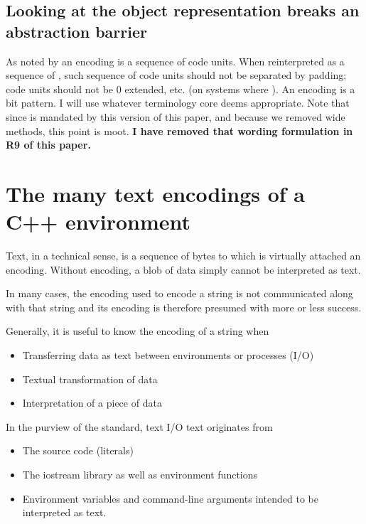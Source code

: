 \documentclass{wg21}
\begin{document}
\subsection{Looking at the object representation breaks an abstraction barrier}

As noted by  an encoding is a sequence of code units.
When reinterpreted as a sequence of , such sequence of code units should not be separated by padding; code units should not be 0 extended, etc. (on systems where ).
An encoding is a bit pattern.
I will use whatever terminology core deems appropriate. Note that since  is mandated by this version of this paper, and because we removed wide methods, this point is moot.
\textbf{I have removed that wording formulation in R9 of this paper.}

\pagebreak

\section{The many text encodings of a C++ environment}

Text, in a technical sense, is a sequence of bytes to which is virtually attached an encoding.
Without encoding, a blob of data simply cannot be interpreted as text.

In many cases, the encoding used to encode a string is not communicated along with that string and its
encoding is therefore presumed with more or less success.

Generally, it is useful to know the encoding of a string when

\begin{itemize}
    \item Transferring data as text between environments or processes (I/O)
    \item Textual transformation of data
    \item Interpretation of a piece of data
\end{itemize}

In the purview of the standard, text I/O text originates from
\begin{itemize}
    \item The source code (literals)
    \item The iostream library as well as environment functions
    \item Environment variables and command-line arguments intended to be interpreted as text.
\end{itemize}
\end{document}

